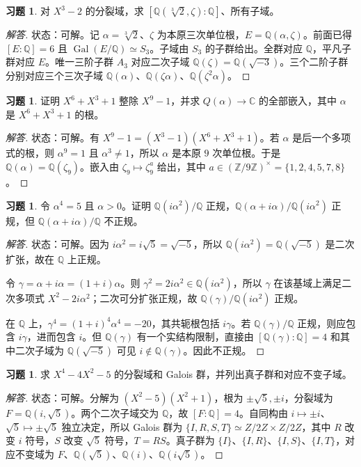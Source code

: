 \documentclass[11pt,a4paper,openany]{ctexbook}
\numberwithin{equation}{chapter}
\newcommand{\Q}{\mathbb{Q}}
\newcommand{\C}{\mathbb{C}}
\newcommand{\Z}{\mathbb{Z}}
\newcommand{\Gal}{\operatorname{Gal}}
\theoremstyle{plain}
\theoremstyle{definition}
\newtheorem{exercise}[theorem]{习题}
\theoremstyle{remark}
\begin{document}
\begin{exercise}
对 $X^3-2$ 的分裂域，求 $[\Q(\sqrt[3]{2},\zeta):\Q]$、所有子域。
\end{exercise}
\begin{proof}[解答]
状态：可解。记 $\alpha=\sqrt[3]{2}$、$\zeta$ 为本原三次单位根，$E=\Q(\alpha,\zeta)$。前面已得 $[E:\Q]=6$ 且 $\Gal(E/\Q)\simeq S_3$。子域由 $S_3$ 的子群给出。全群对应 $\Q$，平凡子群对应 $E$。唯一三阶子群 $A_3$ 对应二次子域 $\Q(\zeta)=\Q(\sqrt{-3})$。三个二阶子群分别对应三个三次子域 $\Q(\alpha)$、$\Q(\zeta\alpha)$、$\Q(\zeta^2\alpha)$。
\end{proof}

\begin{exercise}
证明 $X^6+X^3+1$ 整除 $X^9-1$，并求 $Q(\alpha)\to\C$ 的全部嵌入，其中 $\alpha$ 是 $X^6+X^3+1$ 的根。
\end{exercise}
\begin{proof}[解答]
状态：可解。有 $X^9-1=(X^3-1)(X^6+X^3+1)$。若 $\alpha$ 是后一个多项式的根，则 $\alpha^9=1$ 且 $\alpha^3\ne1$，所以 $\alpha$ 是本原 $9$ 次单位根。于是 $\Q(\alpha)=\Q(\zeta_9)$。嵌入由 $\zeta_9\mapsto\zeta_9^a$ 给出，其中 $a\in(\Z/9\Z)^\times=\{1,2,4,5,7,8\}$。
\end{proof}

\begin{exercise}
令 $\alpha^4=5$ 且 $\alpha>0$。证明 $\Q(i\alpha^2)/\Q$ 正规，$\Q(\alpha+i\alpha)/\Q(i\alpha^2)$ 正规，但 $\Q(\alpha+i\alpha)/\Q$ 不正规。
\end{exercise}
\begin{proof}[解答]
状态：可解。因为 $i\alpha^2=i\sqrt5=\sqrt{-5}$，所以 $\Q(i\alpha^2)=\Q(\sqrt{-5})$ 是二次扩张，故在 $\Q$ 上正规。

令 $\gamma=\alpha+i\alpha=(1+i)\alpha$。则 $\gamma^2=2i\alpha^2\in\Q(i\alpha^2)$，所以 $\gamma$ 在该基域上满足二次多项式 $X^2-2i\alpha^2$；二次可分扩张正规，故 $\Q(\gamma)/\Q(i\alpha^2)$ 正规。

在 $\Q$ 上，$\gamma^4=(1+i)^4\alpha^4=-20$，其共轭根包括 $i\gamma$。若 $\Q(\gamma)/\Q$ 正规，则应包含 $i\gamma$，进而包含 $i$。但 $\Q(\gamma)$ 有一个实结构限制，直接由 $[\Q(\gamma):\Q]=4$ 和其中二次子域为 $\Q(\sqrt{-5})$ 可见 $i\notin\Q(\gamma)$。因此不正规。
\end{proof}

\begin{exercise}
求 $X^4-4X^2-5$ 的分裂域和 Galois 群，并列出真子群和对应不变子域。
\end{exercise}
\begin{proof}[解答]
状态：可解。分解为 $(X^2-5)(X^2+1)$，根为 $\pm\sqrt5,\pm i$，分裂域为 $F=\Q(i,\sqrt5)$。两个二次子域交为 $\Q$，故 $[F:\Q]=4$。自同构由 $i\mapsto\pm i$、$\sqrt5\mapsto\pm\sqrt5$ 独立决定，所以 Galois 群为 $\{I,R,S,T\}\simeq Z/2Z\times Z/2Z$，其中 $R$ 改变 $i$ 符号，$S$ 改变 $\sqrt5$ 符号，$T=RS$。真子群为 $\{I\}$、$\{I,R\}$、$\{I,S\}$、$\{I,T\}$，对应不变域为 $F$、$\Q(\sqrt5)$、$\Q(i)$、$\Q(i\sqrt5)$。
\end{proof}
\end{document}
